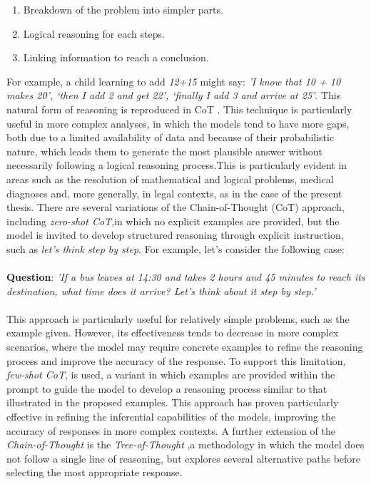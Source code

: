 \begin{enumerate}
    \item Breakdown of the problem into simpler parts.
    \item Logical reasoning for each steps.
    \item Linking information to reach a conclusion.
\end{enumerate}
For example, a child learning to add \textit{12+15} might say: \textit{'I know that 10 + 10 makes 20’, ‘then I add 2 and get 22’, ‘finally I add 3 and arrive at 25'}.
This natural form of reasoning is reproduced in CoT \cite{Cot}. 
This technique is particularly useful in more complex analyses, in which the models tend to have more gaps, both due to a limited availability of data and because of their probabilistic nature, which leads them to generate the most plausible answer without necessarily following a logical reasoning process.This is particularly evident in areas such as the resolution of mathematical and logical problems, medical diagnoses and, more generally, in legal contexts, as in the case of the present thesis.
There are several variations of the Chain-of-Thought (CoT) approach, including \textit{zero-shot CoT},in which no explicit examples are provided, but the model is invited to develop structured reasoning through explicit instruction, such as \textit{let's think step by step}. 
For example, let's consider the following case:\\
\\
\textbf{Question}: \textit{'If a bus leaves at 14:30 and takes 2 hours and 45 minutes to reach its destination, what time does it arrive? Let's think about it step by step.'}\\
\\
This approach is particularly useful for relatively simple problems, such as the example given. However, its effectiveness tends to decrease in more complex scenarios, where the model may require concrete examples to refine the reasoning process and improve the accuracy of the response.
To support this limitation, \textit{few-shot CoT},  is used, a variant in which examples are provided within the prompt to guide the model to develop a reasoning process similar to that illustrated in the proposed examples. This approach has proven particularly effective in refining the inferential capabilities of the models, improving the accuracy of responses in more complex contexts.
A further extension of the \textit{Chain-of-Thought} is the \textit{Tree-of-Thought} \cite{ToT},a methodology in which the model does not follow a single line of reasoning, but explores several alternative paths before selecting the most appropriate response.
